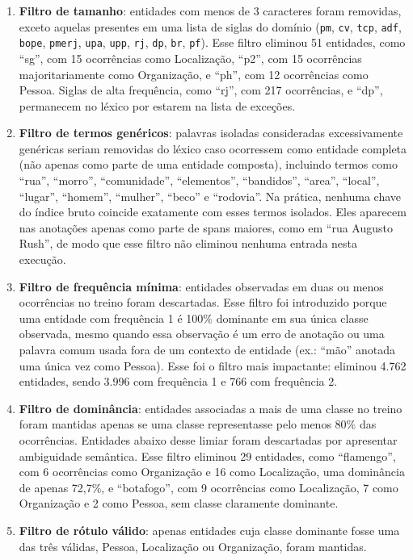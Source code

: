 \documentclass[12pt,a4paper]{article}
\begin{document}
\begin{enumerate}
  \item \textbf{Filtro de tamanho}: entidades com menos de 3 caracteres foram
    removidas, exceto aquelas presentes em uma lista de siglas do domínio
    (\texttt{pm}, \texttt{cv}, \texttt{tcp}, \texttt{adf}, \texttt{bope},
    \texttt{pmerj}, \texttt{upa}, \texttt{upp}, \texttt{rj}, \texttt{dp},
    \texttt{br}, \texttt{pf}). Esse filtro eliminou 51 entidades, como ``sg'',
    com 15 ocorrências como Localização, ``p2'', com 15 ocorrências
    majoritariamente como Organização, e ``ph'', com 12 ocorrências como
    Pessoa. Siglas de alta frequência, como ``rj'', com 217 ocorrências, e
    ``dp'', permanecem no léxico por estarem na lista de exceções.

  \item \textbf{Filtro de termos genéricos}: palavras isoladas consideradas
    excessivamente genéricas seriam removidas do léxico caso ocorressem como
    entidade completa (não apenas como parte de uma entidade composta),
    incluindo termos como ``rua'', ``morro'', ``comunidade'', ``elementos'',
    ``bandidos'', ``area'', ``local'', ``lugar'', ``homem'', ``mulher'',
    ``beco'' e ``rodovia''. Na prática, nenhuma chave do índice bruto coincide
    exatamente com esses termos isolados. Eles aparecem nas anotações apenas
    como parte de spans maiores, como em ``rua Augusto Rush'', de modo que
    esse filtro não eliminou nenhuma entrada nesta execução.

  \item \textbf{Filtro de frequência mínima}: entidades observadas em duas ou
    menos ocorrências no treino foram descartadas. Esse filtro foi introduzido
    porque uma entidade com frequência 1 é 100\%
    dominante em sua única classe observada, mesmo quando essa observação é um
    erro de anotação ou uma palavra comum usada fora de um contexto de
    entidade (ex.: ``mão'' anotada uma única vez como Pessoa). Esse foi o
    filtro mais impactante: eliminou 4.762 entidades, sendo 3.996 com
    frequência 1 e 766 com frequência 2.

  \item \textbf{Filtro de dominância}: entidades associadas a mais de uma classe
    no treino foram mantidas apenas se uma classe representasse pelo menos 80\%
    das ocorrências. Entidades abaixo desse limiar foram descartadas por
    apresentar ambiguidade semântica. Esse filtro eliminou 29 entidades, como
    ``flamengo'', com 6 ocorrências como Organização e 16 como Localização,
    uma dominância de apenas 72,7\%, e ``botafogo'', com 9 ocorrências como
    Localização, 7 como Organização e 2 como Pessoa, sem classe claramente
    dominante.

  \item \textbf{Filtro de rótulo válido}: apenas entidades cuja classe dominante
    fosse uma das três válidas, Pessoa, Localização ou Organização, foram mantidas.
\end{enumerate}
\end{document}
